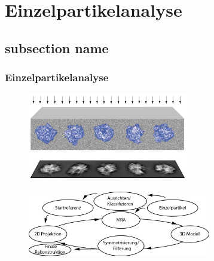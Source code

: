 \section[EPA]{Einzelpartikelanalyse} %
\label{sec:einzelpartikelanalyse}
\subsection*{subsection name} %
\label{sub:subsection_name}

\begin{frame}
	\frametitle{Einzelpartikelanalyse}
	\begin{figure}
		\includegraphics[width = 7cm]{pic/epa2.png}
	\end{figure}
	\begin{figure}
		\includegraphics[width = 8cm]{pic/epa_all.png}
	\end{figure}
\end{frame}

